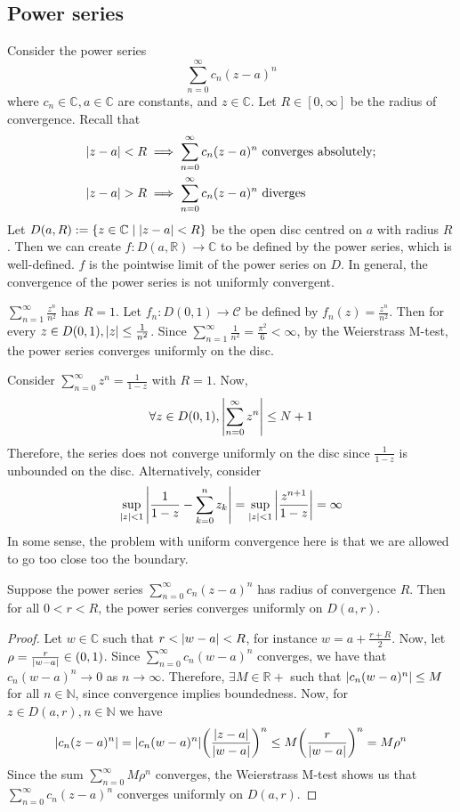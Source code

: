 \subsection{Power series}
Consider the power series
\[
	\sum_{n=0}^\infty c_n (z-a)^n
\]
where \( c_n \in \mathbb C, a \in \mathbb C \) are constants, and \( z \in \mathbb C \).
Let \( R \in [0, \infty] \) be the radius of convergence.
Recall that
\begin{align*}
	\abs{z-a} < R & \implies \sum_{n = 0}^\infty c_n (z-a)^n \text{ converges absolutely}; \\
	\abs{z-a} > R & \implies \sum_{n = 0}^\infty c_n (z-a)^n \text{ diverges}
\end{align*}
Let \( D(a, R) := \qty{z \in \mathbb C \mid \abs{z-a} < R} \) be the open disc centred on \( a \) with radius \( R \).
Then we can create \( f \colon D(a, \mathbb R) \to \mathbb C \) to be defined by the power series, which is well-defined.
\( f \) is the pointwise limit of the power series on \( D \).
In general, the convergence of the power series is not uniformly convergent.
\begin{example}
	\( \sum_{n=1}^\infty \frac{z^n}{n^2} \) has \( R = 1 \).
	Let \( f_n \colon D(0,1) \to \mathcal C \) be defined by \( f_n(z) = \frac{z^n}{n^2} \).
	Then for every \( z \in D(0,1), \abs{z} \leq \frac{1}{n^2} \).
	Since \( \sum_{n=1}^\infty \frac{1}{n^2} = \frac{\pi^2}{6} < \infty \), by the Weierstrass M-test, the power series converges uniformly on the disc.
\end{example}
\begin{example}
	Consider \( \sum_{n=0}^\infty z^n = \frac{1}{1-z} \) with \( R = 1 \).
	Now,
	\[
		\forall z \in D(0,1), \abs{\sum_{n=0}^\infty z^n} \leq N + 1
	\]
	Therefore, the series does not converge uniformly on the disc since \( \frac{1}{1-z} \) is unbounded on the disc.
	Alternatively, consider
	\[
		\sup_{\abs{z} < 1} \abs{\frac{1}{1-z} - \sum_{k=0}^n z_k} = \sup_{\abs{z} < 1} \abs{\frac{z^{n+1}}{1-z}} = \infty
	\]
	In some sense, the problem with uniform convergence here is that we are allowed to go too close too the boundary.
\end{example}
\begin{theorem}
	Suppose the power series \( \sum_{n=0}^\infty c_n (z-a)^n \) has radius of convergence \( R \).
	Then for all \( 0 < r < R \), the power series converges uniformly on \( D(a,r) \).
\end{theorem}
\begin{proof}
	Let \( w \in \mathbb C \) such that \( r < \abs{w - a} < R \), for instance \( w = a + \frac{r + R}{2} \).
	Now, let \( \rho = \frac{r}{\abs{w-a}} \in (0,1) \).
	Since \( \sum_{n=0}^\infty c_n (w-a)^n \) converges, we have that \( c_n (w-a)^n \to 0 \) as \( n \to \infty \).
	Therefore, \( \exists M \in \mathbb R+ \) such that \( \abs{c_n (w-a)^n} \leq M \) for all \( n \in \mathbb N \), since convergence implies boundedness.
	Now, for \( z \in D(a,r), n \in \mathbb N \) we have
	\[
		\abs{c_n(z-a)^n} = \abs{c_n(w-a)^n} \qty(\frac{\abs{z-a}}{\abs{w-a}})^n \leq M \qty(\frac{r}{\abs{w-a}})^n = M\rho^n
	\]
	Since the sum \( \sum_{n=0}^\infty M \rho^n \) converges, the Weierstrass M-test shows us that \( \sum_{n=0}^\infty c_n (z-a)^n \) converges uniformly on \( D(a,r) \).
\end{proof}
